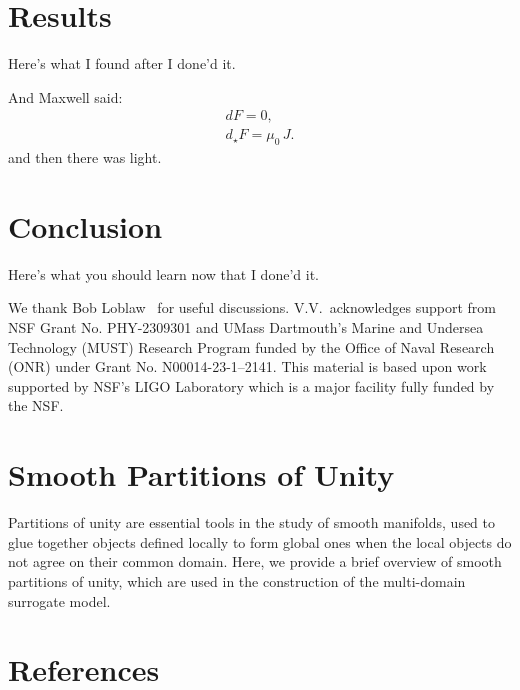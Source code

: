 \documentclass[aps,prd,amsmath,floats,floatfix, twocolumn,
superscriptaddress,nofootinbib,showpacs,longbibliography]{revtex4-1}
\begin{document}
\section{Results}
\label{sec:results}
Here's what I found after I done'd it.

And Maxwell said:
\begin{gather}
    dF = 0, \\
    d_{\star}F = \mu_0 \, J.
\label{eq:doppler_mass}
\end{gather}
and then there was light.


\section{Conclusion}
\label{sec:conclusion}
Here's what you should learn now that I done'd it.


\begin{acknowledgments}
We thank Bob Loblaw~\cite{BobLoblaw} for useful discussions.
V.V.~acknowledges support from NSF Grant No. PHY-2309301 and UMass Dartmouth’s
Marine and Undersea Technology (MUST) Research Program funded by the Office of
Naval Research (ONR) under Grant No. N00014-23-1–2141.
This material is based upon work supported by NSF's LIGO Laboratory which is a
major facility fully funded by the NSF.
\end{acknowledgments}

\appendix
\section{Smooth Partitions of Unity}
\label{app:partitions_of_unity}
Partitions of unity are essential tools in the study of smooth manifolds, used to glue together objects defined locally to form global ones when the local objects do not agree on their common domain. Here, we provide a brief overview of smooth partitions of unity, which are used in the construction of the multi-domain surrogate model. 
\section*{References}

\end{document}
